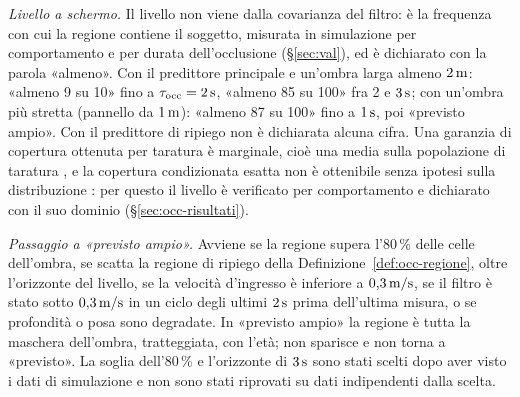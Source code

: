 \emph{Livello a schermo.} Il livello non viene dalla covarianza del filtro: è la frequenza con cui la regione contiene il soggetto, misurata in simulazione per comportamento e per durata dell'occlusione (\S\ref{sec:val}), ed è dichiarato con la parola «almeno». Con il predittore principale e un'ombra larga almeno $2\,\mathrm{m}$: «almeno 9 su 10» fino a $\tau_{\mathrm{occ}}=2\,\mathrm{s}$, «almeno 85 su 100» fra 2 e $3\,\mathrm{s}$; con un'ombra più stretta (pannello da $1\,\mathrm{m}$): «almeno 87 su 100» fino a $1\,\mathrm{s}$, poi «previsto ampio». Con il predittore di ripiego non è dichiarata alcuna cifra. Una garanzia di copertura ottenuta per taratura è marginale, cioè una media sulla popolazione di taratura \cite{angelopoulos2021}, e la copertura condizionata esatta non è ottenibile senza ipotesi sulla distribuzione \cite{barber2019}: per questo il livello è verificato per comportamento e dichiarato con il suo dominio (\S\ref{sec:occ-risultati}).

\emph{Passaggio a «previsto ampio».} Avviene se la regione supera l'80\,\% delle celle dell'ombra, se scatta la regione di ripiego della Definizione~\ref{def:occ-regione}, oltre l'orizzonte del livello, se la velocità d'ingresso è inferiore a $0{,}3\,\mathrm{m/s}$, se il filtro è stato sotto $0{,}3\,\mathrm{m/s}$ in un ciclo degli ultimi $2\,\mathrm{s}$ prima dell'ultima misura, o se profondità o posa sono degradate. In «previsto ampio» la regione è tutta la maschera dell'ombra, tratteggiata, con l'età; non sparisce e non torna a «previsto». La soglia dell'80\,\% e l'orizzonte di $3\,\mathrm{s}$ sono stati scelti dopo aver visto i dati di simulazione e non sono stati riprovati su dati indipendenti dalla scelta.

